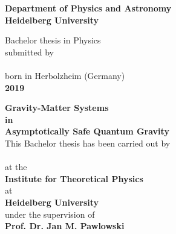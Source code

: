{\hypersetup{allcolors=black}
\begin{titlepage}

	\begin{center}
		\makeatletter
		\vspace{2cm}
		\Large\textbf{Department of Physics and Astronomy\\
			Heidelberg University}
		
		\vfill
		\normalsize
		Bachelor thesis in Physics\\
		\normalsize
		submitted by\\[0.4cm]
		\Large
		\textbf{\@author}\\[0.4cm]
		\normalsize
		born in Herbolzheim (Germany) \\ [0.4cm]
		\Large\textbf{2019}

		\cleardoublepage
		\thispagestyle{empty}
		\LARGE\textbf{Gravity-Matter Systems \\ in \\
		Asymptotically Safe Quantum Gravity}\\[.4cm]

		\vfill
		\normalsize
		This Bachelor thesis has been carried out by \\ 
		\vspace{3pt}
		\textbf{\@author}  \\ 
		\vspace{3pt}
		at the\\
		\vspace{3pt}
		\textbf{Institute for Theoretical Physics} \\ at \\\textbf{Heidelberg University}\\
		\vspace{5pt}
		under the supervision of\\
		\vspace{5pt}
		\textbf{Prof. Dr. Jan M. Pawlowski}
		
		\makeatother
	\end{center}
\cleardoublepage
\end{titlepage}}  
